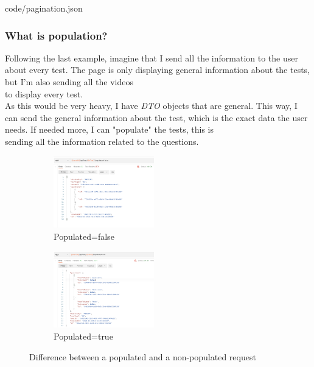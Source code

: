         
        {code/pagination.json}
        
        \subsubsection{What is population?}
        Following the last example, imagine that I send all the information to the user about every test. The page is only displaying general information about the tests, but I'm also sending all the videos \\
        to display every test. \\
        
        As this would be very heavy, I have \textit{DTO} objects that are general. This way, I can send the general information about the test, which is the exact data the user needs. If needed more, I can "populate" the tests, this is \\
        sending all the information related to the questions.

        \begin{figure}[H]
            \centering
            \begin{subfigure}[T]{0.49\textwidth}
                \centering
                \includegraphics[width=0.48\textwidth]{assets/populated_false.png}
                \caption{Populated=false}
                \label{fig:impl_populated_false}
            \end{subfigure}
            \hfill
            \begin{subfigure}[T]{0.49\textwidth}
                \centering
                \includegraphics[width=0.48\textwidth]{assets/populated_true.png}
                \caption{Populated=true}
                \label{fig:impl_populated_true}
            \end{subfigure}
               \caption{Difference between a populated and a non-populated request}
               \label{fig:impl_populated}
        \end{figure}

